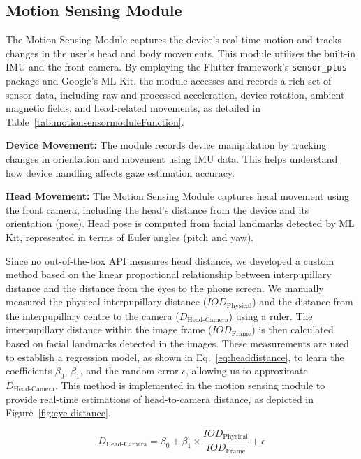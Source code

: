 \subsection{Motion Sensing Module}\label{subsec:motion_sensing_module}

The Motion Sensing Module captures the device's real-time motion and tracks changes in the user's head and body movements. This module utilises the built-in IMU and the front camera. By employing the Flutter framework's \texttt{sensor\_plus} package and Google's ML Kit, the module accesses and records a rich set of sensor data, including raw and processed acceleration, device rotation, ambient magnetic fields, and head-related movements, as detailed in Table~\ref{tab:motionsensormoduleFunction}.

\textbf{Device Movement:} The module records device manipulation by tracking changes in orientation and movement using IMU data. This helps understand how device handling affects gaze estimation accuracy.

\textbf{Head Movement:} The Motion Sensing Module captures head movement using the front camera, including the head's distance from the device and its orientation (pose). Head pose is computed from facial landmarks detected by ML Kit, represented in terms of Euler angles (pitch and yaw).

Since no out-of-the-box API measures head distance, we developed a custom method based on the linear proportional relationship between interpupillary distance and the distance from the eyes to the phone screen. We manually measured the physical interpupillary distance ($IOD_{\text{Physical}}$) and the distance from the interpupillary centre to the camera ($D_{\text{Head-Camera}}$) using a ruler. The interpupillary distance within the image frame ($IOD_{\text{Frame}}$) is then calculated based on facial landmarks detected in the images. These measurements are used to establish a regression model, as shown in Eq.~\ref{eq:headdistance}, to learn the coefficients $\beta_0$, $\beta_1$, and the random error $\epsilon$, allowing us to approximate $D_{\text{Head-Camera}}$. This method is implemented in the motion sensing module to provide real-time estimations of head-to-camera distance, as depicted in Figure~\ref{fig:eye-distance}.

\begin{equation}
    D_{\text{Head-Camera}} = \beta_0 + \beta_1 \times \frac{IOD_{\text{Physical}}}{IOD_{\text{Frame}}} + \epsilon
    \label{eq:headdistance}
\end{equation}

